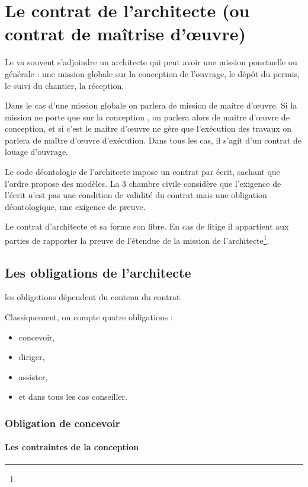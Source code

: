 
\chapter{Le contrat de l'architecte (ou contrat de maîtrise d'œuvre)}

	Le \Mo va souvent s’adjoindre un architecte qui peut avoir une mission ponctuelle ou générale : une mission globale sur la conception de l’ouvrage, le dépôt du permis, le suivi du chantier, la réception.


	Dans le cas d'une mission globale on parlera de mission de maitre d’œuvre. Si la mission ne porte que sur la conception , on parlera alors de maitre d’œuvre de conception, et si c’est le maitre d’œuvre ne gère que l’exécution des travaux on parlera de maître d’œuvre d’exécution.
Dans tous les cas, il s'agit d'un contrat de louage d'ouvrage.

	Le code déontologie de l’architecte impose un contrat par écrit, sachant que l’ordre propose des modèles. La 3\ieme{} chambre civile considère que l’exigence de l’écrit n’est pas une condition de validité du contrat mais une obligation déontologique, une exigence de preuve.


	Le contrat d’architecte et sa forme son libre. En cas de litige il appartient aux parties de rapporter la preuve de l’étendue de la mission de l’architecte\footnote{}.

\section{Les obligations de l'architecte}

	les obligations dépendent du contenu du contrat.

	Classiquement, on compte quatre obligations :
	\begin{itemize}
		\item concevoir,
		\item diriger,
		\item assister,
		\item et dans tous les cas conseiller.
	\end{itemize}

	\subsection{Obligation de concevoir}

		\subsubsection{Les contraintes de la conception}

